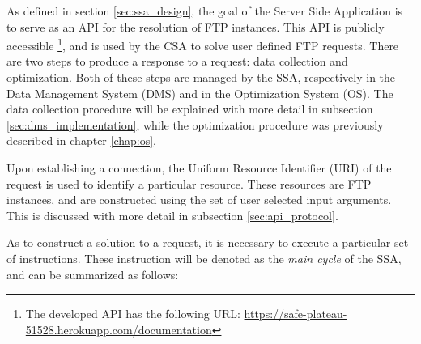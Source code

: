 As defined in section \ref{sec:ssa_design}, the goal of the Server Side Application is to serve as an API for the resolution of FTP instances. This API is publicly accessible \footnote{The developed API has the following URL: \url{https://safe-plateau-51528.herokuapp.com/documentation}}, and is used by the CSA to solve user defined FTP requests. There are two steps to produce a response to a request: data collection and optimization. Both of these steps are managed by the SSA, respectively in the Data Management System (DMS) and in the Optimization System (OS). The data collection procedure will be explained with more detail in subsection \ref{sec:dms_implementation}, while the optimization procedure was previously described in chapter \ref{chap:os}.


Upon establishing a connection, the Uniform Resource Identifier (URI) of the request is used to identify a particular resource. These resources are FTP instances, and are constructed using the set of user selected input arguments. This is discussed with more detail in subsection \ref{sec:api_protocol}.


As to construct a solution to a request, it is necessary to execute a particular set of instructions. These instruction will be denoted as the \textit{main cycle} of the SSA, and can be summarized as follows: 

